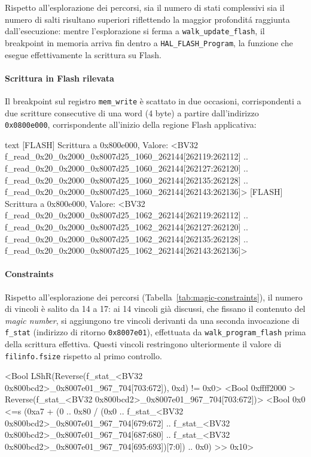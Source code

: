     Rispetto all'esplorazione dei percorsi, sia il numero di stati complessivi sia il numero di salti risultano superiori riflettendo la maggior profonditá raggiunta dall'esecuzione: mentre l'esplorazione si ferma a \texttt{walk\_update\_flash}, il breakpoint in memoria arriva fin dentro a \texttt{HAL\_FLASH\_Program}, la funzione che esegue effettivamente la scrittura su Flash.

    \paragraph{Scrittura in Flash rilevata}

        Il breakpoint sul registro \texttt{mem\_write} è scattato in due 
        occasioni, corrispondenti a due scritture consecutive di una word 
        (4 byte) a partire dall'indirizzo \texttt{0x0800e000}, corrispondente 
        all'inizio della regione Flash applicativa:
\begin{bashcode}{text}
[FLASH] Scrittura a 0x800e000, Valore: <BV32 f_read_0x20_0x2000_0x8007d25_1060_262144[262119:262112] .. 
    f_read_0x20_0x2000_0x8007d25_1060_262144[262127:262120] .. 
    f_read_0x20_0x2000_0x8007d25_1060_262144[262135:262128] .. 
    f_read_0x20_0x2000_0x8007d25_1060_262144[262143:262136]>
[FLASH] Scrittura a 0x800e000, Valore: <BV32 f_read_0x20_0x2000_0x8007d25_1062_262144[262119:262112] .. 
    f_read_0x20_0x2000_0x8007d25_1062_262144[262127:262120] .. 
    f_read_0x20_0x2000_0x8007d25_1062_262144[262135:262128] .. 
    f_read_0x20_0x2000_0x8007d25_1062_262144[262143:262136]>
\end{bashcode}

        \paragraph{Constraints}
        
        Rispetto all'esplorazione dei percorsi (Tabella~\ref{tab:magic-constraints}), 
        il numero di vincoli è salito da 14 a 17: ai 14 vincoli già discussi, 
        che fissano il contenuto del \textit{magic number}, si aggiungono tre vincoli 
        derivanti da una seconda invocazione di \texttt{f\_stat} (indirizzo di 
        ritorno \texttt{0x8007e01}), effettuata da \texttt{walk\_program\_flash} 
        prima della scrittura effettiva. Questi vincoli restringono 
        ulteriormente il valore di \texttt{filinfo.fsize} rispetto al primo 
        controllo.

\begin{bashcode}
<Bool LShR(Reverse(f_stat_<BV32 0x800bcd2>_0x8007e01_967_704[703:672]), 0xd) != 0x0>
<Bool 0xffff2000 > Reverse(f_stat_<BV32 0x800bcd2>_0x8007e01_967_704[703:672])>
<Bool 0x0 <=s (0xa7 + (0 .. 0x80 / (0x0 .. f_stat_<BV32 0x800bcd2>_0x8007e01_967_704[679:672] .. 
    f_stat_<BV32 0x800bcd2>_0x8007e01_967_704[687:680] .. 
    f_stat_<BV32 0x800bcd2>_0x8007e01_967_704[695:693])[7:0]) .. 0x0) >> 0x10>
\end{bashcode}

